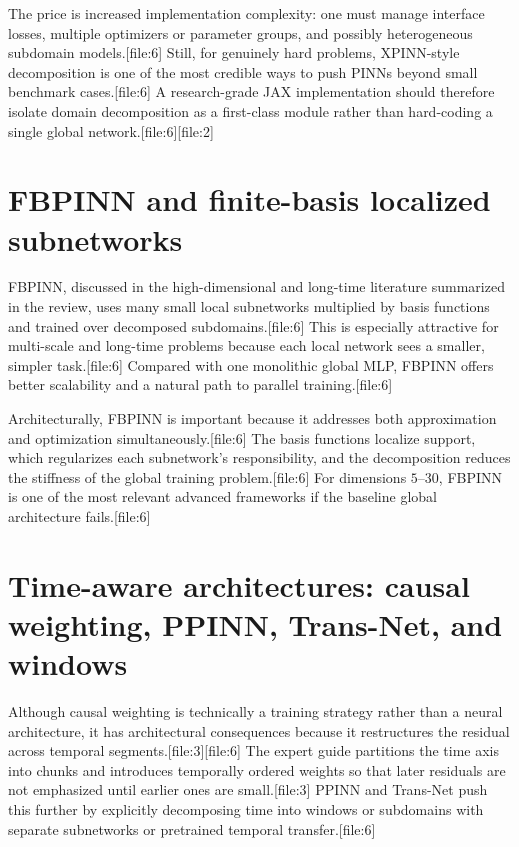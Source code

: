 \documentclass[11pt]{report}
\begin{document}
The price is increased implementation complexity: one must manage interface losses, multiple optimizers or parameter groups, and possibly heterogeneous subdomain models.[file:6]  
Still, for genuinely hard problems, XPINN-style decomposition is one of the most credible ways to push PINNs beyond small benchmark cases.[file:6]  
A research-grade JAX implementation should therefore isolate domain decomposition as a first-class module rather than hard-coding a single global network.[file:6][file:2]

\section{FBPINN and finite-basis localized subnetworks}

FBPINN, discussed in the high-dimensional and long-time literature summarized in the review, uses many small local subnetworks multiplied by basis functions and trained over decomposed subdomains.[file:6]  
This is especially attractive for multi-scale and long-time problems because each local network sees a smaller, simpler task.[file:6]  
Compared with one monolithic global MLP, FBPINN offers better scalability and a natural path to parallel training.[file:6]

Architecturally, FBPINN is important because it addresses both approximation and optimization simultaneously.[file:6]  
The basis functions localize support, which regularizes each subnetwork’s responsibility, and the decomposition reduces the stiffness of the global training problem.[file:6]  
For dimensions \(5\)–\(30\), FBPINN is one of the most relevant advanced frameworks if the baseline global architecture fails.[file:6]

\section{Time-aware architectures: causal weighting, PPINN, Trans-Net, and windows}

Although causal weighting is technically a training strategy rather than a neural architecture, it has architectural consequences because it restructures the residual across temporal segments.[file:3][file:6]  
The expert guide partitions the time axis into chunks and introduces temporally ordered weights so that later residuals are not emphasized until earlier ones are small.[file:3]  
PPINN and Trans-Net push this further by explicitly decomposing time into windows or subdomains with separate subnetworks or pretrained temporal transfer.[file:6]
\end{document}
